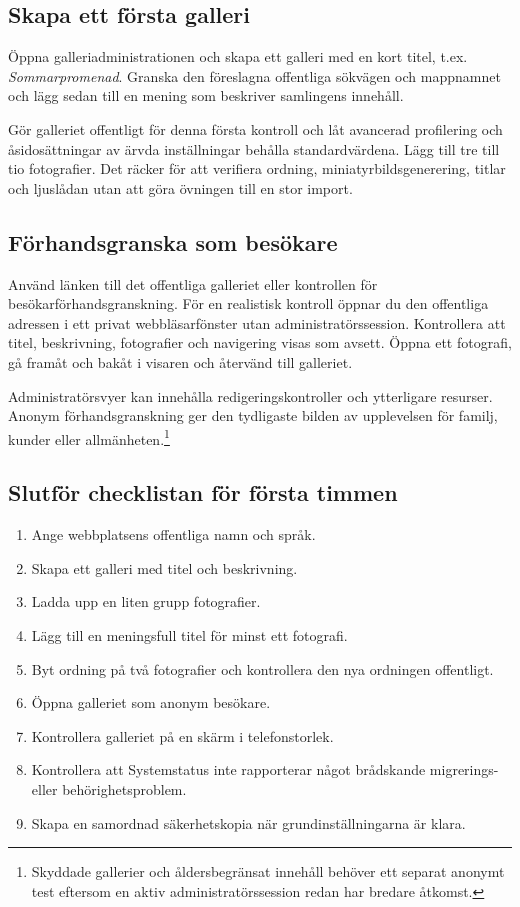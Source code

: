 \documentclass[11pt,a4paper]{article}
\begin{document}
\subsection{Skapa ett första galleri}

Öppna galleriadministrationen och skapa ett galleri med en kort titel, t.ex.
\emph{Sommarpromenad}. Granska den föreslagna offentliga sökvägen och mappnamnet
och lägg sedan till en mening som beskriver samlingens innehåll.

Gör galleriet offentligt för denna första kontroll och låt avancerad profilering
och åsidosättningar av ärvda inställningar behålla standardvärdena. Lägg till
tre till tio fotografier. Det räcker för att verifiera ordning,
miniatyrbildsgenerering, titlar och ljuslådan utan att göra övningen till en
stor import.

\subsection{Förhandsgranska som besökare}

Använd länken till det offentliga galleriet eller kontrollen för
besökarförhandsgranskning. För en realistisk kontroll öppnar du den offentliga
adressen i ett privat webbläsarfönster utan administratörssession. Kontrollera
att titel, beskrivning, fotografier och navigering visas som avsett. Öppna ett
fotografi, gå framåt och bakåt i visaren och återvänd till galleriet.

Administratörsvyer kan innehålla redigeringskontroller och ytterligare resurser.
Anonym förhandsgranskning ger den tydligaste bilden av upplevelsen för familj,
kunder eller allmänheten.\footnote{Skyddade gallerier och åldersbegränsat
innehåll behöver ett separat anonymt test eftersom en aktiv
administratörssession redan har bredare åtkomst.}

\subsection{Slutför checklistan för första timmen}

\begin{enumerate}
  \item Ange webbplatsens offentliga namn och språk.
  \item Skapa ett galleri med titel och beskrivning.
  \item Ladda upp en liten grupp fotografier.
  \item Lägg till en meningsfull titel för minst ett fotografi.
  \item Byt ordning på två fotografier och kontrollera den nya ordningen
  offentligt.
  \item Öppna galleriet som anonym besökare.
  \item Kontrollera galleriet på en skärm i telefonstorlek.
  \item Kontrollera att Systemstatus inte rapporterar något brådskande
  migrerings- eller behörighetsproblem.
  \item Skapa en samordnad säkerhetskopia när grundinställningarna är klara.
\end{enumerate}
\end{document}
